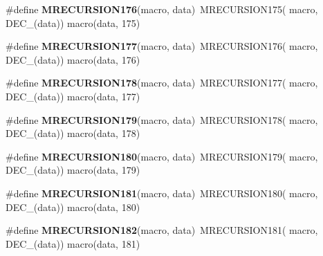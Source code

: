 \begin{DoxyCompactItemize}
\item 
\hypertarget{group__group__sam0__utils__mrecursion_gac99e671e0d43b04a1f6bb626ce84b1a7}{}\#define {\bfseries M\+R\+E\+C\+U\+R\+S\+I\+O\+N176}(macro,  data)~M\+R\+E\+C\+U\+R\+S\+I\+O\+N175(  macro, D\+E\+C\+\_\+(data))   macro(data, 175)\label{group__group__sam0__utils__mrecursion_gac99e671e0d43b04a1f6bb626ce84b1a7}

\item 
\hypertarget{group__group__sam0__utils__mrecursion_ga91b7223f3d5817342eec1d975ab07d8d}{}\#define {\bfseries M\+R\+E\+C\+U\+R\+S\+I\+O\+N177}(macro,  data)~M\+R\+E\+C\+U\+R\+S\+I\+O\+N176(  macro, D\+E\+C\+\_\+(data))   macro(data, 176)\label{group__group__sam0__utils__mrecursion_ga91b7223f3d5817342eec1d975ab07d8d}

\item 
\hypertarget{group__group__sam0__utils__mrecursion_ga10c159986773d51f28784bb35f5dac4c}{}\#define {\bfseries M\+R\+E\+C\+U\+R\+S\+I\+O\+N178}(macro,  data)~M\+R\+E\+C\+U\+R\+S\+I\+O\+N177(  macro, D\+E\+C\+\_\+(data))   macro(data, 177)\label{group__group__sam0__utils__mrecursion_ga10c159986773d51f28784bb35f5dac4c}

\item 
\hypertarget{group__group__sam0__utils__mrecursion_gaf2dbd67d5e3cf26998df6bf3bcb687c9}{}\#define {\bfseries M\+R\+E\+C\+U\+R\+S\+I\+O\+N179}(macro,  data)~M\+R\+E\+C\+U\+R\+S\+I\+O\+N178(  macro, D\+E\+C\+\_\+(data))   macro(data, 178)\label{group__group__sam0__utils__mrecursion_gaf2dbd67d5e3cf26998df6bf3bcb687c9}

\item 
\hypertarget{group__group__sam0__utils__mrecursion_ga1f3f8c01c7a9e963459f2101c3a89518}{}\#define {\bfseries M\+R\+E\+C\+U\+R\+S\+I\+O\+N180}(macro,  data)~M\+R\+E\+C\+U\+R\+S\+I\+O\+N179(  macro, D\+E\+C\+\_\+(data))   macro(data, 179)\label{group__group__sam0__utils__mrecursion_ga1f3f8c01c7a9e963459f2101c3a89518}

\item 
\hypertarget{group__group__sam0__utils__mrecursion_gad1cb96b447fac701830cdbdf69fd4f3d}{}\#define {\bfseries M\+R\+E\+C\+U\+R\+S\+I\+O\+N181}(macro,  data)~M\+R\+E\+C\+U\+R\+S\+I\+O\+N180(  macro, D\+E\+C\+\_\+(data))   macro(data, 180)\label{group__group__sam0__utils__mrecursion_gad1cb96b447fac701830cdbdf69fd4f3d}

\item 
\hypertarget{group__group__sam0__utils__mrecursion_ga4bce301f66e1986fd89df43d3d7a6fd9}{}\#define {\bfseries M\+R\+E\+C\+U\+R\+S\+I\+O\+N182}(macro,  data)~M\+R\+E\+C\+U\+R\+S\+I\+O\+N181(  macro, D\+E\+C\+\_\+(data))   macro(data, 181)\label{group__group__sam0__utils__mrecursion_ga4bce301f66e1986fd89df43d3d7a6fd9}


\end{DoxyCompactItemize}
